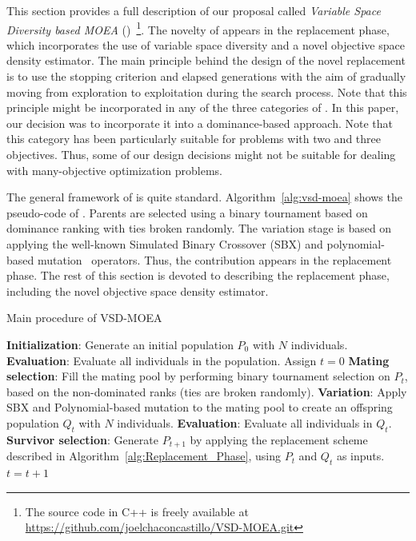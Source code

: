 
This section provides a full description of our proposal called \textit{Variable Space Diversity based MOEA} 
(\VSDMOEA{})~\footnote{The source code in C++ is freely available at \url{https://github.com/joelchaconcastillo/VSD-MOEA.git}}.
%
The novelty of \VSDMOEA{} appears in the replacement phase, which incorporates
the use of variable space diversity and a novel objective space density estimator. 
%
The main principle behind the design of the novel replacement is to use the stopping criterion and 
elapsed generations with the aim of gradually moving from exploration to exploitation during the search process.
%
Note that this principle might be incorporated in any of the three categories of \MOEAS{}.
%
In this paper, our decision was to incorporate it into a dominance-based approach.
%
Note that this category has been particularly suitable for problems with two and three objectives.
%
Thus, some of our design decisions might not be suitable for dealing with many-objective optimization problems.

The general framework of \VSDMOEA{} is quite standard.
%
Algorithm~\ref{alg:vsd-moea} shows the pseudo-code of \VSDMOEA{}.
%
Parents are selected using a binary tournament based on dominance ranking with ties broken randomly.
%
The variation stage is based on applying the well-known Simulated Binary Crossover (SBX) 
and polynomial-based mutation~\cite{Joel:SBX1994, Joel:Mutation} operators.
%
Thus, the contribution appears in the replacement phase.
%
The rest of this section is devoted to describing the replacement phase, including the novel objective space density 
estimator.

\begin{algorithm}[t]
	\caption{Main procedure of VSD-MOEA} 
	\begin{small}
\begin{algorithmic}[1]
 	\STATE \textbf{Initialization}: Generate an initial population $P_0$ with $N$ individuals.
	\STATE \textbf{Evaluation}: Evaluate all individuals in the population.
	\STATE Assign $t=0$
	   \STATE \textbf{Mating selection}: Fill the mating pool by performing binary tournament selection on $P_t$, 
		 based on the non-dominated ranks (ties are broken randomly).
	   \STATE \textbf{Variation}: Apply SBX and Polynomial-based mutation to the mating pool to create an offspring population $Q_t$
		 with $N$ individuals.
		 \STATE \textbf{Evaluation}: Evaluate all individuals in $Q_t$.
	   \STATE \textbf{Survivor selection}: Generate $P_{t+1}$ by applying the replacement scheme 
		 described in Algorithm~\ref{alg:Replacement_Phase}, using $P_t$ and $Q_t$ as inputs.
	   \STATE $t=t+1$
	\ENDWHILE
	\end{algorithmic}
	\end{small}
\label{alg:vsd-moea}
\end{algorithm}

